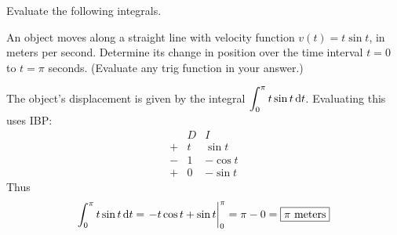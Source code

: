 \documentclass[12pt,answers]{exam}
\begin{document}
\begin{questions}
\newpage
\question Evaluate the following integrals.

\newpage
\question[10]
An object moves along a straight line with velocity function $v(t) = t \sin t$, in meters per second. Determine its change in position over the time interval $t = 0$ to $t = \pi$ seconds. (Evaluate any trig function in your answer.)
\begin{solution}
	The object's displacement is given by the integral $\displaystyle \int_0^\pi t \sin t \dif t$.
	Evaluating this uses IBP:
	\[
		\begin{array}{ccc}
			& D & I \\ 
			+ & t & \sin t \\ 
			- & 1 & -\cos t \\ 
			+ & 0 & -\sin t
		\end{array}
	\]
	Thus
	\[
		\int_0^\pi t \sin t \dif t
		= \eval{-t \cos t + \sin t}_0^\pi
		= \pi - 0 = \boxed{\pi \text{ meters}}
	\]
\end{solution}


\end{questions}
\end{document}
